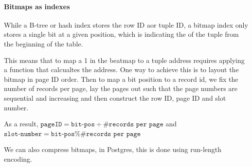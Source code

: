 \paragraph{Bitmaps as indexes}
While a B-tree or hash index stores the row ID aor tuple ID, a bitmap index only stores a single bit at a given position,
which is indicating the of the tuple from the beginning of the table.

This means that to map a 1 in the beatmap to a tuple address requires applying a function that calcualtes the address.
One way to achieve this is to layout the bitmap in page ID order. Then to map a bit position to a record id,
we fix the number of records per page, lay the pages out such that the page numbers are sequential and increasing and then construct the row ID, page ID and slot number.

As a result, $\texttt{pageID} = \texttt{bit-pos} \div \#\texttt{records per page}$ and $\texttt{slot-number} = \texttt{bit-pos} \% \#\texttt{records per page}$

We can also compress bitmaps, in Postgres, this is done using run-length encoding.
